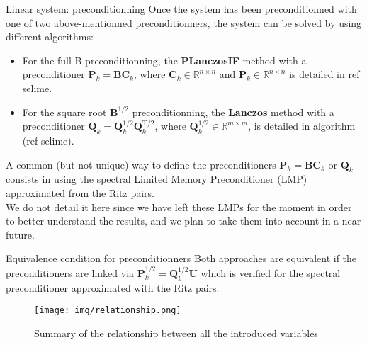 \documentclass[10pt]{beamer}
\begin{document}
\begin{frame}{Linear system: preconditionning}
Once the system has been preconditionned with one of two above-mentionned preconditionners, the system can be solved by using different algorithms:\\
\vspace{+0.3cm}
\begin{itemize}
 \item For the full B preconditionning, the \textbf{PLanczosIF} method with a preconditioner $\mathbf{P}_k = \mathbf{B}\mathbf{C}_k$, where $\mathbf{C}_k \in \mathbb{R}^{n \times n}$ and $\mathbf{P}_k \in \mathbb{R}^{n \times n}$ is detailed in ref selime.
 \vspace{+0.3cm}
 \item For the square root $\mathbf{B}^{1/2}$ preconditionning, the \textbf{Lanczos} method with a preconditioner $\mathbf{Q}_k = \mathbf{Q}_k^{1/2} \mathbf{Q}_k^{\mathrm{T}/2}$, where $\mathbf{Q}_k^{1/2} \in \mathbb{R}^{m \times m}$, is detailed in algorithm (ref selime).\\
 \end{itemize}
 \vspace{+0.3cm}
A common (but not unique) way to define the preconditioners $\mathbf{P}_k = \mathbf{B}\mathbf{C}_k$ or $\mathbf{Q}_k$ consists in using the spectral Limited Memory Preconditioner (LMP) approximated from the Ritz pairs.\\
We do not detail it here since we have left these LMPs for the moment in order to better understand the results, and we plan to take them into account in a near future.
\end{frame}

\begin{frame}{Equivalence condition for preconditionners}
Both approaches are equivalent if the preconditioners are linked via $\mathbf{P}^{1/2}_k = \mathbf{Q}^{1/2}_k \mathbf{U}$ \small{which is verified for the spectral preconditioner approximated with the Ritz pairs.}
\begin{center}
 \begin{figure}
 \label{relation}
  \texttt{[image: img/relationship.png]}
  \caption{Summary of the relationship between all the introduced variables}
 \end{figure}
\end{center}
\end{frame}
\end{document}
